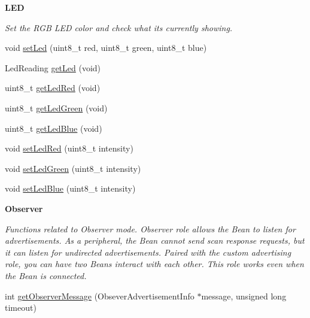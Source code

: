\begin{Indent}{\bf L\+E\+D}\par
{\em Set the R\+G\+B L\+E\+D color and check what it\textquotesingle{}s currently showing. }\begin{DoxyCompactItemize}
\item 
void \hyperlink{class_bean_class_a7af1f9d1edb112f761db9b69686b5a5a}{set\+Led} (uint8\+\_\+t red, uint8\+\_\+t green, uint8\+\_\+t blue)
\item 
Led\+Reading \hyperlink{class_bean_class_ab73794fbf27d0297ead453ca60ac4aaf}{get\+Led} (void)
\item 
uint8\+\_\+t \hyperlink{class_bean_class_aea8736bf91c03de609233ddb270fb77d}{get\+Led\+Red} (void)
\item 
uint8\+\_\+t \hyperlink{class_bean_class_a5619292a562731e94f97e93432ab3639}{get\+Led\+Green} (void)
\item 
uint8\+\_\+t \hyperlink{class_bean_class_a8dcd68a87dc75dd0fe912483cc05fa43}{get\+Led\+Blue} (void)
\item 
void \hyperlink{class_bean_class_adfc2642320c53819c83bbaa59bbcef9b}{set\+Led\+Red} (uint8\+\_\+t intensity)
\item 
void \hyperlink{class_bean_class_ae1955c0312d1fa90bfeb847dada48c8c}{set\+Led\+Green} (uint8\+\_\+t intensity)
\item 
void \hyperlink{class_bean_class_ac09c0f3cea6025e2e12e8b6c5419434b}{set\+Led\+Blue} (uint8\+\_\+t intensity)
\end{DoxyCompactItemize}
\end{Indent}
\begin{Indent}{\bf Observer}\par
{\em Functions related to Observer mode. Observer role allows the Bean to listen for advertisements. As a peripheral, the Bean cannot send scan response requests, but it can listen for undirected advertisements. Paired with the custom advertising role, you can have two Beans interact with each other. This role works even when the Bean is connected. }\begin{DoxyCompactItemize}
\item 
int \hyperlink{class_bean_class_a4d5307962a778b8cd8b792b196c5f908}{get\+Observer\+Message} (Obsever\+Advertisement\+Info $\ast$message, unsigned long timeout)
\end{DoxyCompactItemize}
\end{Indent}
